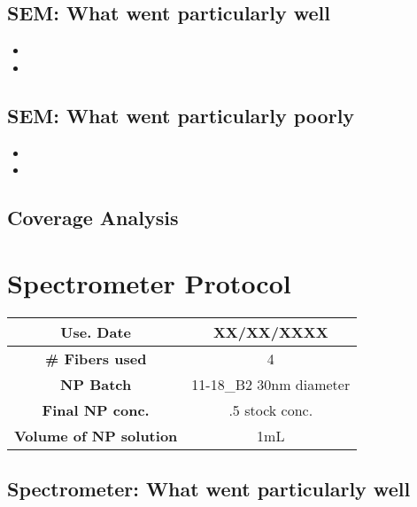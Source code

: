 
\subsection{SEM: {\color{blue} What went particularly well}}


\begin{itemize}
\item{}
\item{}
\end{itemize}

\subsection{SEM: {\color{red} What went particularly poorly}}

\begin{itemize}
\item{}
\item{}
\end{itemize}

\subsection{Coverage Analysis}


\section{Spectrometer Protocol}

\begin{center}
\begin{tabular}{| c | c |}
 \hline
 {\bf Use. Date} & XX/XX/XXXX \\ \hline
 {\bf \# Fibers used} & 4 \\ \hline
 {\bf NP Batch} & 11-18\_B2 30nm diameter \\ \hline
 {\bf Final NP conc.} & .5 stock conc.  \\ \hline
 {\bf Volume of NP solution} & 1mL \\ \hline
\end{tabular}
\end{center}

\vspace{.3cm}


\subsection{Spectrometer: {\color{blue} What went particularly well}}

